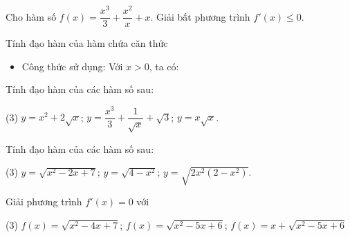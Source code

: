 \begin{vd}
	Cho hàm số $ f(x) = \dfrac{x^3}{3} + \dfrac{x^2}{x} +x $. Giải bất phương trình $ f'(x) \le 0 $.
\end{vd} 

\begin{dang}{Tính đạo hàm của hàm chứa căn thức}
	\begin{itemize}
		\item [\iconCH] Công thức sử dụng: Với $x>0$, ta có:
	\end{itemize}
\end{dang}

\begin{vd}
	Tính đạo hàm của các hàm số sau:
	\begin{tasks}(3)
		\task $y=x^2+2\sqrt{x}$;
		\task $y=\dfrac{x^3}{3}+\dfrac{1}{\sqrt{x}}+\sqrt{3}$;
		\task $y=x\sqrt{x}$.
	\end{tasks}
\end{vd} 

\begin{vd}
	Tính đạo hàm của các hàm số sau:
	\begin{tasks}(3)
		\task $y=\sqrt{x^2-2x+7}$;
		\task $y=\sqrt{4-x^2}$;
		\task $y=\sqrt{2x^2(2-x^2)}$.
	\end{tasks}
\end{vd} 

\begin{vd}
	Giải phương trình $f'(x)=0$ với
	\begin{tasks}(3)
		\task $f(x)=\sqrt{x^2-4x+7}$;
		\task $f(x)=\sqrt{x^2-5x+6}$;
		\task $f(x)=x+\sqrt{x^2-5x+6}$
	\end{tasks}
\end{vd} 

